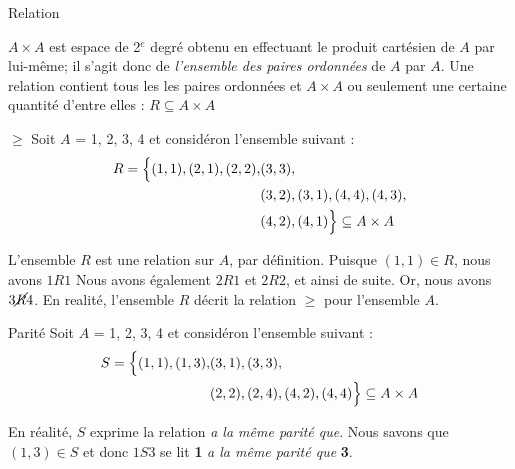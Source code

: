 \documentclass[16pt]{report}
\begin{document}
\begin{multicols*}{2}
\begin{Definitionx}{Relation}{}
            \end{Definitionx}

            \begin{note}{}{}
                $A \times A$ est espace de 2$^e$ degré obtenu en effectuant le produit cartésien de 
                $A$ par lui-même; il s'agit donc de \textit{l'ensemble des paires ordonnées} 
                de $A$ par $A$. Une relation contient tous les les paires ordonnées et $A \times A$ ou 
                seulement une certaine quantité d'entre elles : $R \subseteq A \times A$
            \end{note}


            \begin{EExample}{$\geq$}{}
                Soit $A$ = {1, 2, 3, 4} et considéron l'ensemble suivant : 
                \begin{align*}
                    R = \Bigl\{ (1,1), (2,1), (2,2), &(3,3),\\ 
                                                &(3,2), (3,1), (4,4), (4,3),\\ 
                                                &(4,2), (4,1)\Bigr\} \subseteq A \times A
                \end{align*}

                L'ensemble $R$ est une relation sur $A$, par définition. Puisque $(1,1) \in R$, nous avons 
                $1R1$ Nous avons également $2R1$ et $2R2$, et ainsi de suite. Or, nous avons 
                $3\cancel{R}4$. En realité, l'ensemble $R$ décrit la relation $\geq$ pour l'ensemble $A$. 
            \end{EExample}


            \begin{EExample}{Parité}{}
                 Soit $A$ = {1, 2, 3, 4} et considéron l'ensemble suivant : 
                \begin{align*}
                    S = \Bigl\{ (1,1), (1,3), &(3,1), (3,3), \\ 
                                              &(2,2), (2,4), (4,2), (4,4)
                                              \Bigr\} \subseteq A \times A
                \end{align*}

                En réalité, $S$ exprime la relation \textit{a la même parité que}. 
                Nous savons que $(1,3) \in S$ et donc $1S3$ se lit \textbf{1}  
                \textit{a la même parité que} \textbf{3}.      
            \end{EExample}


\end{multicols*}
\end{document}
